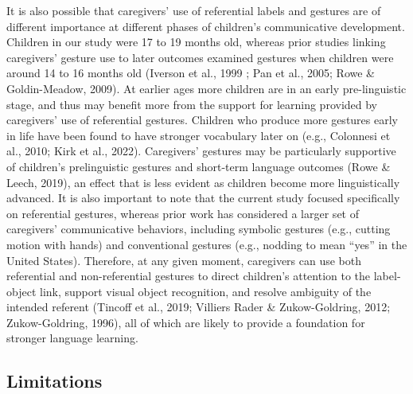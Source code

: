 \documentclass[
  english,
  man,floatsintext]{apa6}
\begin{document}
It is also possible that caregivers' use of referential labels and gestures are of different importance at different phases of children's communicative development. Children in our study were 17 to 19 months old, whereas prior studies linking caregivers' gesture use to later outcomes examined gestures when children were around 14 to 16 months old (Iverson et al., 1999 ; Pan et al., 2005; Rowe \& Goldin-Meadow, 2009). At earlier ages more children are in an early pre-linguistic stage, and thus may benefit more from the support for learning provided by caregivers' use of referential gestures. Children who produce more gestures early in life have been found to have stronger vocabulary later on (e.g., Colonnesi et al., 2010; Kirk et al., 2022). Caregivers' gestures may be particularly supportive of children's prelinguistic gestures and short-term language outcomes (Rowe \& Leech, 2019), an effect that is less evident as children become more linguistically advanced. It is also important to note that the current study focused specifically on referential gestures, whereas prior work has considered a larger set of caregivers' communicative behaviors, including symbolic gestures (e.g., cutting motion with hands) and conventional gestures (e.g., nodding to mean \enquote{yes} in the United States). Therefore, at any given moment, caregivers can use both referential and non-referential gestures to direct children's attention to the label-object link, support visual object recognition, and resolve ambiguity of the intended referent (Tincoff et al., 2019; Villiers Rader \& Zukow-Goldring, 2012; Zukow-Goldring, 1996), all of which are likely to provide a foundation for stronger language learning.

\hypertarget{limitations}{%
\subsection{Limitations}\label{limitations}}
\end{document}
